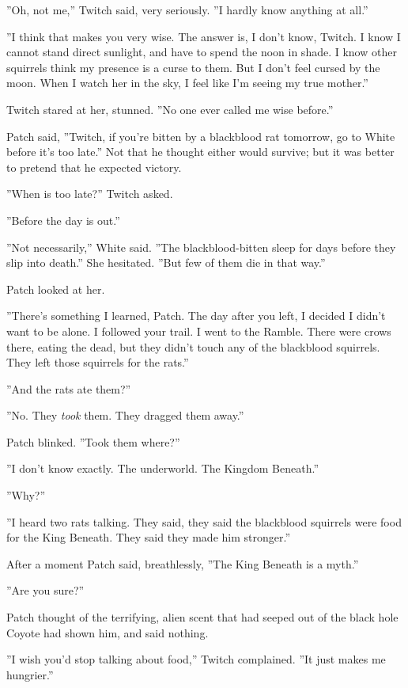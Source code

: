 \documentclass[11pt]{article}
\begin{document}
 ''Oh, not me,'' Twitch said, very seriously. ''I hardly know anything at all.''\par
 ''I think that makes you very wise. The answer is, I don't know, Twitch. I know I cannot stand direct sunlight, and have to spend the noon in shade. I know other squirrels think my presence is a curse to them. But I don't feel cursed by the moon. When I watch her in the sky, I feel like I'm seeing my true mother.''\par
 Twitch stared at her, stunned. ''No one ever called me wise before.''\par
 Patch said, ''Twitch, if you're bitten by a blackblood rat tomorrow, go to White before it's too late.'' Not that he thought either would survive; but it was better to pretend that he expected victory.\par
 ''When is too late?'' Twitch asked.\par
 ''Before the day is out.''\par
 ''Not necessarily,'' White said. ''The blackblood-bitten sleep for days before they slip into death.'' She hesitated. ''But few of them die in that way.''\par
 Patch looked at her.\par
 ''There's something I learned, Patch. The day after you left, I decided %
 I didn't want to be alone. I followed your trail. I went to the Ramble. There were crows there, eating the dead, but they didn't touch any of the blackblood squirrels. They left those squirrels for the rats.''\par
 ''And the rats ate them?''\par
 ''No. They {\it took} them. They dragged them away.''\par
 Patch blinked. ''Took them where?''\par
 ''I don't know exactly. The underworld. The Kingdom Beneath.''\par
 ''Why?''\par
 ''I heard two rats talking. They said, they said the blackblood squirrels were food for the King Beneath. They said they made him stronger.''\par
 After a moment Patch said, breathlessly, ''The King Beneath is a myth.''\par
 ''Are you sure?''\par
 Patch thought of the terrifying, alien scent that had seeped out of the black hole Coyote had shown him, and said nothing.\par
 ''I wish you'd stop talking about food,'' Twitch complained. ''It just makes me hungrier.''\par
\end{document}
